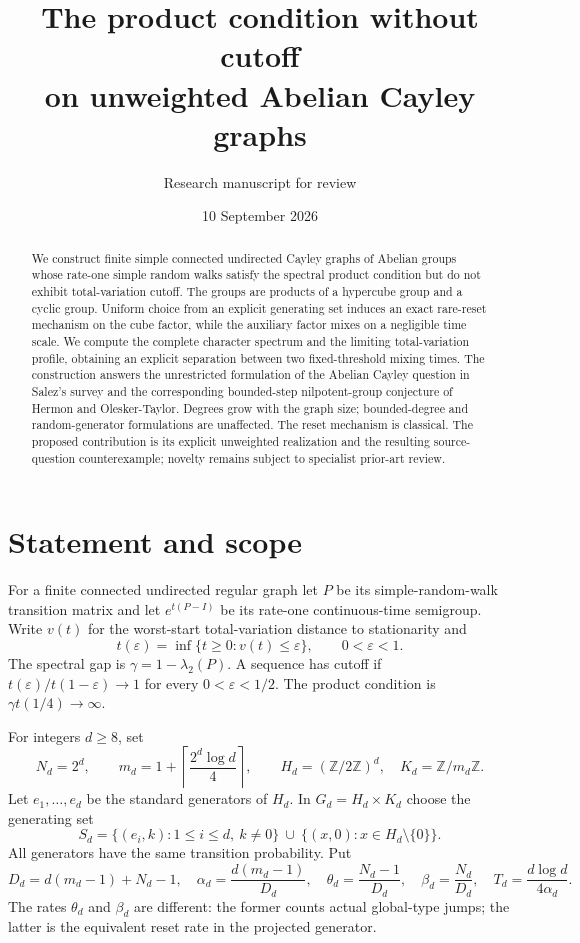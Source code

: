 \documentclass[11pt]{article}
\title{The product condition without cutoff\protect\\on unweighted Abelian Cayley graphs}
\author{Research manuscript for review}\date{10 September 2026}
\theoremstyle{remark}\newtheorem{remark}[theorem]{Remark}
\newcommand{\Z}{\mathbb Z}\newcommand{\Pp}{\mathbb P}\newcommand{\E}{\mathbb E}
\begin{document}
\maketitle
\begin{abstract}
We construct finite simple connected undirected Cayley graphs of Abelian groups whose rate-one simple random walks satisfy the spectral product condition but do not exhibit total-variation cutoff. The groups are products of a hypercube group and a cyclic group. Uniform choice from an explicit generating set induces an exact rare-reset mechanism on the cube factor, while the auxiliary factor mixes on a negligible time scale. We compute the complete character spectrum and the limiting total-variation profile, obtaining an explicit separation between two fixed-threshold mixing times. The construction answers the unrestricted formulation of the Abelian Cayley question in Salez's survey and the corresponding bounded-step nilpotent-group conjecture of Hermon and Olesker-Taylor. Degrees grow with the graph size; bounded-degree and random-generator formulations are unaffected. The reset mechanism is classical. The proposed contribution is its explicit unweighted realization and the resulting source-question counterexample; novelty remains subject to specialist prior-art review.
\end{abstract}

\section{Statement and scope}
For a finite connected undirected regular graph let $P$ be its simple-random-walk transition matrix and let $e^{t(P-I)}$ be its rate-one continuous-time semigroup. Write $v(t)$ for the worst-start total-variation distance to stationarity and
\[
 t(\varepsilon)=\inf\{t\ge0:v(t)\le\varepsilon\},\qquad 0<\varepsilon<1.
\]
The spectral gap is $\gamma=1-\lambda_2(P)$. A sequence has cutoff if $t(\varepsilon)/t(1-\varepsilon)\to1$ for every $0<\varepsilon<1/2$. The product condition is $\gamma t(1/4)\to\infty$.

For integers $d\ge8$, set
\begin{equation}\label{eq:parameters}
 N_d=2^d,\qquad m_d=1+\left\lceil\frac{2^d\log d}{4}\right\rceil,
 \qquad H_d=(\Z/2\Z)^d,\quad K_d=\Z/m_d\Z.
\end{equation}
Let $e_1,\ldots,e_d$ be the standard generators of $H_d$. In $G_d=H_d\times K_d$ choose the generating set
\begin{equation}\label{eq:generators}
 S_d=\{(e_i,k):1\le i\le d,\ k\ne0\}
 \ \cup\ \{(x,0):x\in H_d\setminus\{0\}\}.
\end{equation}
All generators have the same transition probability. Put
\begin{equation}\label{eq:rates}
 D_d=d(m_d-1)+N_d-1,\quad
 \alpha_d=\frac{d(m_d-1)}{D_d},\quad
 \theta_d=\frac{N_d-1}{D_d},\quad
 \beta_d=\frac{N_d}{D_d},\quad
 T_d=\frac{d\log d}{4\alpha_d}.
\end{equation}
The rates $\theta_d$ and $\beta_d$ are different: the former counts actual global-type jumps; the latter is the equivalent reset rate in the projected generator.
\end{document}
